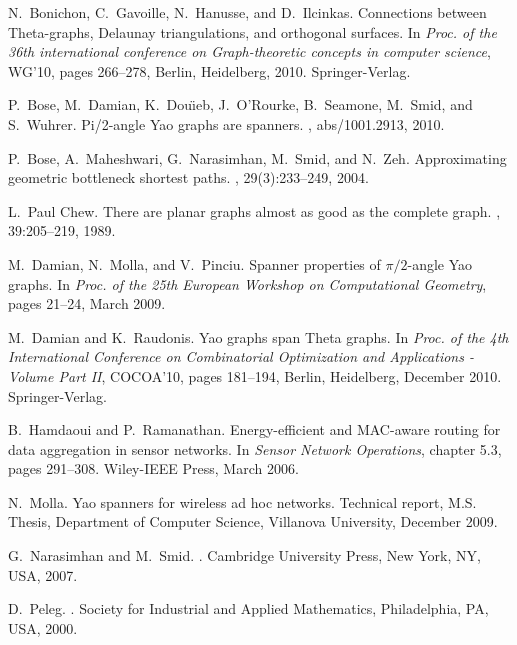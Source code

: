 \documentclass[11pt]{article}
\begin{document}
\medskip


\def\cprime{$'$}
\begin{thebibliography}{10}

N.~Bonichon, C.~Gavoille, N.~Hanusse, and D.~Ilcinkas.
\newblock Connections between {T}heta-graphs, {D}elaunay triangulations, and
  orthogonal surfaces.
\newblock In {\em Proc. of the 36th international conference on Graph-theoretic
  concepts in computer science}, WG'10, pages 266--278, Berlin, Heidelberg,
  2010. Springer-Verlag.

P.~Bose, M.~Damian, K.~Dou\"{\i}eb, J.~O'Rourke, B.~Seamone, M.~Smid, and
  S.~Wuhrer.
\newblock Pi/2-angle {Y}ao graphs are spanners.
, abs/1001.2913, 2010.

P.~Bose, A.~Maheshwari, G.~Narasimhan, M.~Smid, and N.~Zeh.
\newblock Approximating geometric bottleneck shortest paths.
,
  29(3):233--249, 2004.

L.~Paul Chew.
\newblock There are planar graphs almost as good as the complete graph.
, 39:205--219, 1989.

M.~Damian, N.~Molla, and V.~Pinciu.
\newblock Spanner properties of $\pi/2$-angle {Y}ao graphs.
\newblock In {\em Proc. of the 25th European Workshop on Computational
  Geometry}, pages 21--24, March 2009.

M.~Damian and K.~Raudonis.
\newblock Yao graphs span {T}heta graphs.
\newblock In {\em Proc. of the 4th International Conference on Combinatorial
  Optimization and Applications - Volume Part II}, COCOA'10, pages 181--194,
  Berlin, Heidelberg, December 2010. Springer-Verlag.

B.~Hamdaoui and P.~Ramanathan.
\newblock Energy-efficient and {MAC}-aware routing for data aggregation in
  sensor networks.
\newblock In {\em Sensor Network Operations}, chapter 5.3, pages 291--308.
  Wiley-IEEE Press, March 2006.

N.~Molla.
\newblock Yao spanners for wireless ad hoc networks.
\newblock Technical report, M.S. Thesis, Department of Computer Science,
  Villanova University, December 2009.

G.~Narasimhan and M.~Smid.
.
\newblock Cambridge University Press, New York, NY, USA, 2007.

D.~Peleg.
.
\newblock Society for Industrial and Applied Mathematics, Philadelphia, PA,
  USA, 2000.

\end{thebibliography}
\end{document}

